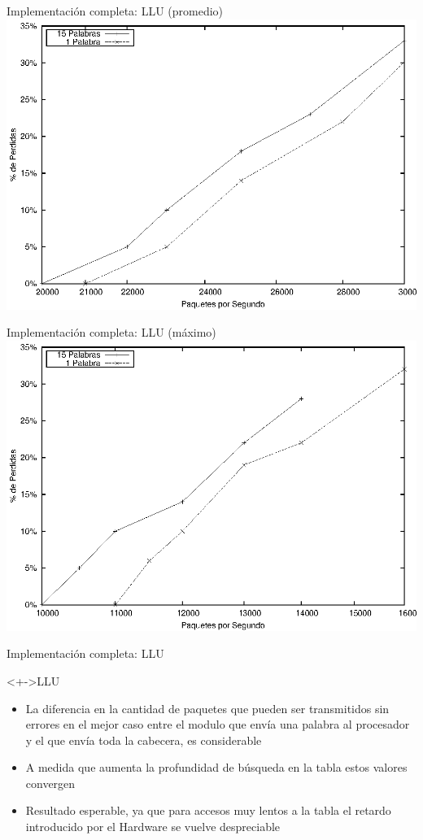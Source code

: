 \documentclass[xcolor=dvipsnames]{beamer}
\begin{document}
\begin{frame}{Implementación completa: LLU (promedio)} 
\center	
\includegraphics[scale=0.70]{figures/lluprom.eps} 
\end{frame}


\begin{frame}{Implementación completa: LLU (máximo)} 
\center	
\includegraphics[scale=0.70]{figures/llumax.eps} 
\end{frame}

\begin{frame}{Implementación completa: LLU} 
 \begin{block}<+->{LLU}   
    \begin{itemize}
      \scriptsize
     	\item La diferencia en la cantidad de paquetes que pueden ser transmitidos sin errores en el mejor caso entre el modulo que envía una palabra al procesador y el que envía toda la cabecera, es considerable
     	\item A medida que aumenta la profundidad de búsqueda en la tabla estos valores convergen
	\item Resultado esperable, ya que para accesos muy lentos a la tabla el retardo introducido por el Hardware se vuelve despreciable
    \end{itemize}
  \end{block}
\end{frame}
\end{document}
